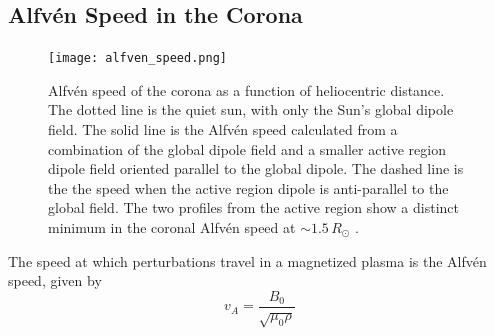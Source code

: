 \subsection{Alfv\'{e}n Speed in the Corona}
\begin{figure}[!t]
\begin{center}
\texttt{[image: alfven\_speed.png]}
\caption[Model of the Aflv\'{e}n speed as a function of height in the corona]{Alfv\'{e}n speed of the corona as a function of heliocentric distance. The dotted line is the quiet sun, with only the Sun's global dipole field. The solid line is the Alfv\'{e}n speed calculated from a combination of the global dipole field and a smaller active region dipole field oriented parallel to the global dipole. The dashed line is the the speed when the active region dipole is anti-parallel to the global field. The two profiles from the active region show a distinct minimum in the coronal Alfv\'{e}n speed at $\sim1.5\,R_{\odot}$ \citep{mann2003}.}
\label{fig:alfven_speed}
\end{center}
\end{figure}
The speed at which perturbations travel in a magnetized plasma is the Alfv\'{e}n speed, given by
\begin{equation}
v_A = \frac{B_0}{\sqrt{\mu_0 \rho}}
\end{equation}

